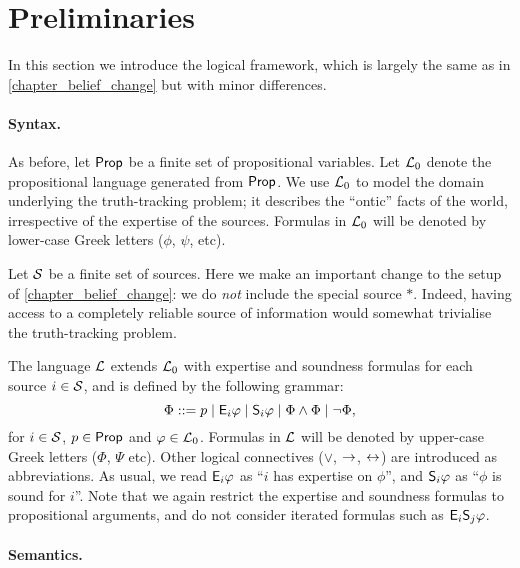\section{Preliminaries}
\label{tt_sec_preliminaries}

In this section we introduce the logical framework, which is largely the same
as in \cref{chapter_belief_change} but with minor differences.

\paragraph{Syntax.}

As before, let $\propvars$ be a finite set of propositional variables. Let $\Lprop$
denote the propositional language generated from $\propvars$. We use $\Lprop$
to model the domain underlying the truth-tracking problem; it describes the
``ontic'' facts of the world, irrespective of the expertise of the sources.
Formulas in $\Lprop$ will be denoted by lower-case Greek letters ($\phi$,
$\psi$, etc).

Let $\srcs$ be a finite set of sources. Here we make an important change to the
setup of \cref{chapter_belief_change}: we do \emph{not} include the special
source $\ast$. Indeed, having access to a completely reliable source of
information would somewhat trivialise the truth-tracking problem.

The language $\L$ extends $\Lprop$ with
expertise and soundness formulas for each source $i \in \srcs$, and is defined
by the following grammar:
\[
    \Phi
    ::= p
    \mid \E_i\phi
    \mid \S_i\phi
    \mid \Phi \land \Phi
    \mid \neg\Phi,
\]
for $i \in \srcs$, $p \in \propvars$ and $\phi \in \Lprop$. Formulas in $\L$
will be denoted by upper-case Greek letters ($\Phi$, $\Psi$ etc). Other logical
connectives ($\lor$, $\limplies$, $\liff$) are introduced as abbreviations.  As
usual, we read $\E_i\phi$ as ``$i$ has expertise on $\phi$'', and $\S_i\phi$ as
``$\phi$ is sound for $i$''. Note that we again restrict the expertise and
soundness formulas to propositional arguments, and do not consider iterated
formulas such as $\E_i\S_j\phi$.

\paragraph{Semantics.}

